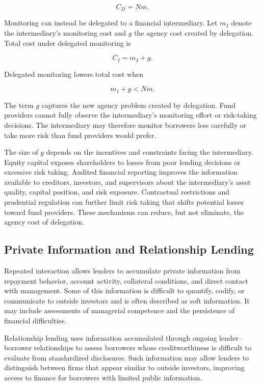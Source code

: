 \begin{equation}
C_D=Nm.
\label{eq:ch4-direct-monitoring}
\end{equation}

Monitoring can instead be delegated to a financial intermediary. Let $m_I$ denote the intermediary's monitoring cost and $g$ the agency cost created by delegation. Total cost under delegated monitoring is

\begin{equation}
C_I=m_I+g.
\label{eq:ch4-delegated-monitoring}
\end{equation}

Delegated monitoring lowers total cost when

\begin{equation}
m_I+g<Nm.
\label{eq:ch4-delegation-condition}
\end{equation}

The term $g$ captures the new agency problem created by delegation. Fund providers cannot fully observe the intermediary's monitoring effort or risk-taking decisions. The intermediary may therefore monitor borrowers less carefully or take more risk than fund providers would prefer.

The size of $g$ depends on the incentives and constraints facing the intermediary. Equity capital exposes shareholders to losses from poor lending decisions or excessive risk taking. Audited financial reporting improves the information available to creditors, investors, and supervisors about the intermediary's asset quality, capital position, and risk exposure. Contractual restrictions and prudential regulation can further limit risk taking that shifts potential losses toward fund providers. These mechanisms can reduce, but not eliminate, the agency cost of delegation.

\subsection{Private Information and Relationship Lending}

Repeated interaction allows lenders to accumulate private information from repayment behavior, account activity, collateral conditions, and direct contact with management. Some of this information is difficult to quantify, codify, or communicate to outside investors and is often described as soft information. It may include assessments of managerial competence and the persistence of financial difficulties.

Relationship lending uses information accumulated through ongoing lender–borrower relationships to assess borrowers whose creditworthiness is difficult to evaluate from standardized disclosures. Such information may allow lenders to distinguish between firms that appear similar to outside investors, improving access to finance for borrowers with limited public information.

